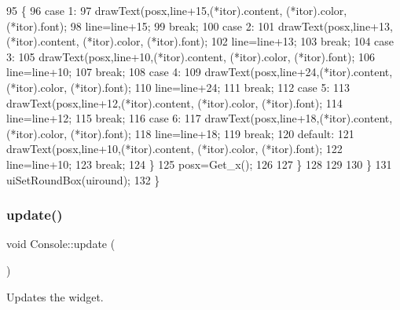 \begin{DoxyCode}
95             \{
96             \textcolor{keywordflow}{case} 1:
97                 drawText(posx,line+15,(*itor).content, (*itor).color, (*itor).font);
98                 line=line+15;
99                 \textcolor{keywordflow}{break};
100             \textcolor{keywordflow}{case} 2:
101                 drawText(posx,line+13,(*itor).content, (*itor).color, (*itor).font);
102                 line=line+13;
103                 \textcolor{keywordflow}{break};
104             \textcolor{keywordflow}{case} 3:
105                 drawText(posx,line+10,(*itor).content, (*itor).color, (*itor).font);
106                 line=line+10;
107                 \textcolor{keywordflow}{break};
108             \textcolor{keywordflow}{case} 4:
109                 drawText(posx,line+24,(*itor).content, (*itor).color, (*itor).font);
110                 line=line+24;
111                 \textcolor{keywordflow}{break};
112             \textcolor{keywordflow}{case} 5:
113                 drawText(posx,line+12,(*itor).content, (*itor).color, (*itor).font);
114                 line=line+12;
115                 \textcolor{keywordflow}{break};
116             \textcolor{keywordflow}{case} 6:
117                 drawText(posx,line+18,(*itor).content, (*itor).color, (*itor).font);
118                 line=line+18;
119                 \textcolor{keywordflow}{break};
120             \textcolor{keywordflow}{default}:
121                 drawText(posx,line+10,(*itor).content, (*itor).color, (*itor).font);
122                 line=line+10;
123                 \textcolor{keywordflow}{break};              
124             \}
125         posx=Get\_x();
126        
127         \}
128 
129         
130     \}
131     uiSetRoundBox(uiround);
132 \}
\end{DoxyCode}
\mbox{\label{class_console_af1d3a54bd8649b46574ad35998563fea}} 
\subsubsection{\texorpdfstring{update()}{update()}}
{\footnotesize\ttfamily void Console\+::update (\begin{DoxyParamCaption}{ }\end{DoxyParamCaption})\hspace{0.3cm}{\ttfamily [virtual]}}



Updates the widget. 

